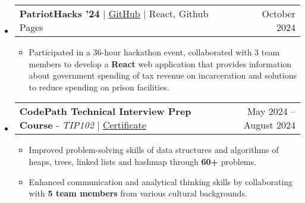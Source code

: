 \documentclass[letterpaper,11pt]{article}
\makeatletter
\newcommand{\resumeItem}[1]{
  \item\small{
    {#1 \vspace{-1pt}}
  }
}
\newcommand{\resumeProjectHeading}[2]{
    \item
    \begin{tabular*}{0.985\textwidth}{l@{\extracolsep{\fill}}r@{\hspace{-0.1in}}}
        \small#1 & \small#2 \\
    \end{tabular*}\vspace{-3pt}
}
\newcommand{\resumeSubHeadingListStart}{\begin{itemize}[leftmargin=0.00in, rightmargin=-0.2in, label={}]\vspace{1pt}}
\newcommand{\resumeSubHeadingListEnd}{\end{itemize}\vspace{-9pt}}
\newcommand{\resumeItemListStart}{\begin{itemize}[leftmargin=0.15in, rightmargin=0.15in]}
\newcommand{\resumeItemListEnd}{\end{itemize}\vspace{-5pt}}
\makeatother
\begin{document}
\resumeSubHeadingListStart
\resumeProjectHeading
{\textbf{PatriotHacks '24} $|$ \href{https://github.com/juhun32/Prison-Break}{\underline{GitHub}} $|$ React, Github Pages}{October 2024}
\resumeItemListStart
\resumeItem{Participated in a 36-hour hackathon event, collaborated with 3 team members to develop a \textbf{React} web application that provides information about government spending of tax revenue on incarceration and solutions to reduce spending on prison facilities.}
\resumeItemListEnd
\resumeSubHeadingListEnd

\resumeSubHeadingListStart
\resumeProjectHeading
{\textbf{CodePath Technical Interview Prep Course} - \emph{TIP102} $|$ \href{https://drive.google.com/file/d/1AF2ZAUXoXeakbAZIJZ_izQ2nd9aNfjYB/view?usp=sharing}{\underline{Certificate}}}{May 2024 -- August 2024}
\resumeItemListStart
\resumeItem{Improved problem-solving skills of data structures and algorithms of heaps, trees, linked lists and hashmap through \textbf{60+} problems.}
\resumeItem{Enhanced communication and analytical thinking skills by collaborating with \textbf{5 team members} from various cultural backgrounds.}
\resumeItemListEnd
\resumeSubHeadingListEnd

\end{document}

